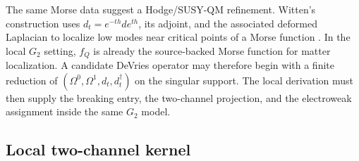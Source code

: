 The same Morse data suggest a Hodge/SUSY-QM refinement.  Witten's construction
uses \(d_t=e^{-th}de^{th}\), its adjoint, and the associated deformed Laplacian
to localize low modes near critical points of a Morse function
\cite{WittenMorse1982}.  In the local \(G_2\) setting, \(f_Q\) is already the
source-backed Morse function for matter localization.  A candidate DeVries
operator may therefore begin with a finite reduction of
\((\Omega^0,\Omega^1,d_t,d_t^\dagger)\) on the singular support.  The local
derivation must then supply the breaking entry, the two-channel projection, and
the electroweak assignment inside the same \(G_2\) model.

\subsection{Local two-channel kernel}
\label{sec:g2-two-channel-kernel}

